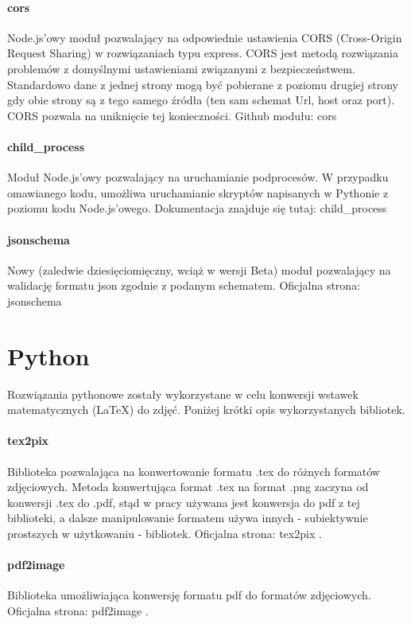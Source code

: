 \paragraph{cors}
Node.js'owy moduł pozwalający na odpowiednie ustawienia CORS (Cross-Origin Request Sharing) w rozwiązaniach typu express. CORS jest metodą rozwiązania problemów z domyślnymi ustawieniami związanymi z bezpieczeństwem. Standardowo dane z jednej strony mogą być pobierane z poziomu drugiej strony gdy obie strony są z tego samego źródła (ten sam schemat Url, host oraz port). CORS pozwala na uniknięcie tej konieczności.
\ind Github modułu: cors \cite{cors}
\paragraph{child\_process}
Moduł Node.js'owy pozwalający na uruchamianie podprocesów. W przypadku omawianego kodu, umożliwa uruchamianie skryptów napisanych  w Pythonie z poziomu kodu Node.js'owego.
\ind Dokumentacja znajduje się tutaj: child\_process \cite{childprocess}
\paragraph{jsonschema}
\ind Nowy (zaledwie dziesięciomięczny, wciąż w wersji Beta) moduł pozwalający na walidację formatu json zgodnie z podanym schematem.
\ind Oficjalna strona: jsonschema \cite{jsonschema}

\section{Python}
Rozwiązania pythonowe zostały wykorzystane w celu konwersji wstawek matematycznych (\LaTeX{}) do zdjęć. Poniżej krótki opis wykorzystanych bibliotek.
\paragraph{tex2pix} Biblioteka pozwalająca na konwertowanie formatu .tex do różnych formatów zdjęciowych. Metoda konwertująca format .tex na format .png zaczyna od konwersji .tex do .pdf, stąd w pracy używana jest konwersja do pdf z tej biblioteki, a dalsze manipulowanie formatem używa innych - subiektywnie prostszych w użytkowaniu - bibliotek. 
\ind Oficjalna strona: tex2pix \cite{tex2pix}.

\paragraph{pdf2image} Biblioteka  umożliwiająca konwersję formatu pdf do formatów zdjęciowych.
\ind Oficjalna strona: pdf2image \cite{pdf2image}.
